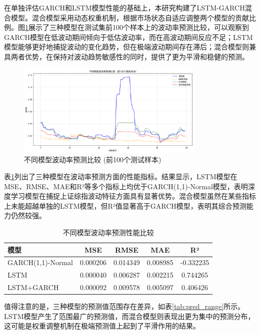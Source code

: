 \documentclass[12pt, a4paper]{article}
\begin{document}
在单独评估GARCH和LSTM模型性能的基础上，本研究构建了LSTM-GARCH混合模型。混合模型采用动态权重机制，根据市场状态自适应调整两个模型的贡献比例。图\ref{fig:vol_pred_compare}展示了三种模型在测试集前100个样本上的波动率预测比较，可以观察到GARCH模型在低波动期间倾向于低估波动率，而在高波动期间反应不足；LSTM模型能够更好地捕捉波动的变化趋势，但在极端波动期间存在滞后；混合模型则兼具两者优势，在保持对波动趋势敏感性的同时，提供了更为平滑和稳健的预测。

\begin{figure}[htbp]
\centering
\includegraphics[width=0.8\textwidth]{./img/不同模型波动率预测比较.png}
\caption{不同模型波动率预测比较 (前100个测试样本)}
\label{fig:vol_pred_compare}
\end{figure}

表\ref{tab:vol_metrics}列出了三种模型在波动率预测方面的性能指标。结果显示，LSTM模型在MSE、RMSE、MAE和R²等多个指标上均优于GARCH(1,1)-Normal模型，表明深度学习模型在捕捉上证综指波动特征方面具有显著优势。混合模型虽然在某些指标上未能超越单独的LSTM模型，但R²值显著高于GARCH模型，表明其综合预测能力仍然较强。

\begin{table}[htbp]
\centering
\caption{不同模型波动率预测性能比较}
\label{tab:vol_metrics}
\begin{tabular}{lcccc}
\toprule
模型 & MSE & RMSE & MAE & R² \\
\midrule
GARCH(1,1)-Normal & 0.000206 & 0.014349 & 0.008985 & -0.332235 \\
LSTM & 0.000040 & 0.006287 & 0.002215 & 0.744265 \\
LSTM+GARCH & 0.000092 & 0.009578 & 0.005097 & 0.406426 \\
\bottomrule
\end{tabular}
\end{table}

值得注意的是，三种模型的预测值范围存在差异，如表\ref{tab:pred_range}所示。LSTM模型产生了范围最广的预测值，而混合模型则表现出更为集中的预测分布，这可能是权重调整机制在极端预测值上起到了平滑作用的结果。
\end{document}
